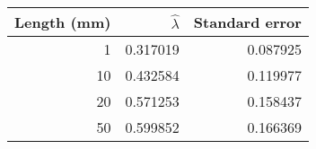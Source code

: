 \begin{tabular}{rrr}
\toprule
 Length (mm) &  $\hat{\lambda}$ &  Standard error \\
\midrule
           1 &         0.317019 &        0.087925 \\
          10 &         0.432584 &        0.119977 \\
          20 &         0.571253 &        0.158437 \\
          50 &         0.599852 &        0.166369 \\
\bottomrule
\end{tabular}
